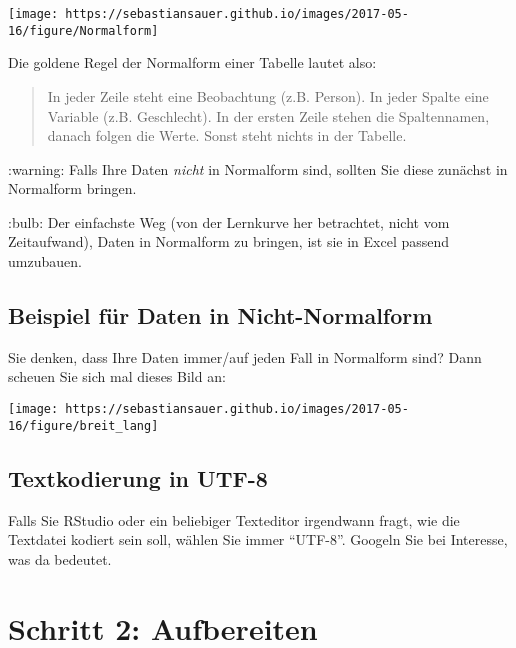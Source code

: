\documentclass[]{article}
\begin{document}
\begin{center}\texttt{[image: https://sebastiansauer.github.io/images/2017-05-16/figure/Normalform]} \end{center}

Die goldene Regel der Normalform einer Tabelle lautet also:

\begin{quote}
In jeder Zeile steht eine Beobachtung (z.B. Person). In jeder Spalte
eine Variable (z.B. Geschlecht). In der ersten Zeile stehen die
Spaltennamen, danach folgen die Werte. Sonst steht nichts in der
Tabelle.
\end{quote}

:warning: Falls Ihre Daten \emph{nicht} in Normalform sind, sollten Sie
diese zunächst in Normalform bringen.

:bulb: Der einfachste Weg (von der Lernkurve her betrachtet, nicht vom
Zeitaufwand), Daten in Normalform zu bringen, ist sie in Excel passend
umzubauen.

\hypertarget{beispiel-fur-daten-in-nicht-normalform}{%
\subsection{Beispiel für Daten in
Nicht-Normalform}\label{beispiel-fur-daten-in-nicht-normalform}}

Sie denken, dass Ihre Daten immer/auf jeden Fall in Normalform sind?
Dann scheuen Sie sich mal dieses Bild an:

\begin{center}\texttt{[image: https://sebastiansauer.github.io/images/2017-05-16/figure/breit\_lang]} \end{center}

\hypertarget{textkodierung-in-utf-8}{%
\subsection{Textkodierung in UTF-8}\label{textkodierung-in-utf-8}}

Falls Sie RStudio oder ein beliebiger Texteditor irgendwann fragt, wie
die Textdatei kodiert sein soll, wählen Sie immer ``UTF-8''. Googeln Sie
bei Interesse, was da bedeutet.

\hypertarget{schritt-2-aufbereiten}{%
\section{Schritt 2: Aufbereiten}\label{schritt-2-aufbereiten}}
\end{document}
